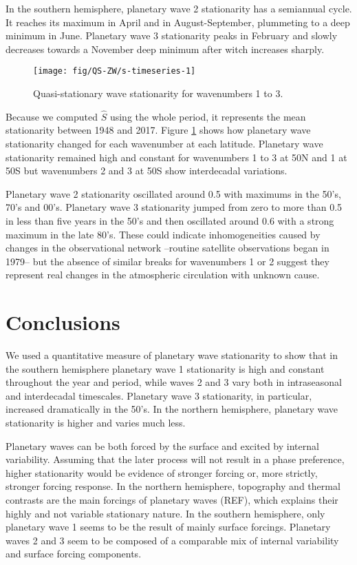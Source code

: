 \documentclass[draft,linenumbers]{agujournal2018}
\begin{document}
In the southern hemisphere, planetary wave 2 stationarity has a
semiannual cycle. It reaches its maximum in April and in
August-September, plummeting to a deep minimum in June. Planetary wave 3
stationarity peaks in February and slowly decreases towards a November
deep minimum after witch increases sharply.

\begin{figure}[h]

{\centering \texttt{[image: fig/QS-ZW/s-timeseries-1]} 

}

\caption{Quasi-stationary wave stationarity for wavenumbers 1 to 3.}\label{fig:s-timeseries}
\end{figure}

Because we computed \(\hat{S}\) using the whole period, it represents
the mean stationarity between 1948 and 2017. Figure
\ref{fig:s-timeseries} shows how planetary wave stationarity changed for
each wavenumber at each latitude. Planetary wave stationarity remained
high and constant for wavenumbers 1 to 3 at 50\degree N and 1 at
50\degree S but wavenumbers 2 and 3 at 50\degree S show interdecadal
variations.

Planetary wave 2 stationarity oscillated around 0.5 with maximums in the
50's, 70's and 00's. Planetary wave 3 stationarity jumped from zero to
more than 0.5 in less than five years in the 50's and then oscillated
around 0.6 with a strong maximum in the late 80's. These could indicate
inhomogeneities caused by changes in the observational network --routine
satellite observations began in 1979-- but the absence of similar breaks
for wavenumbers 1 or 2 suggest they represent real changes in the
atmospheric circulation with unknown cause.

\section{Conclusions}

We used a quantitative measure of planetary wave stationarity to show
that in the southern hemisphere planetary wave 1 stationarity is high
and constant throughout the year and period, while waves 2 and 3 vary
both in intraseasonal and interdecadal timescales. Planetary wave 3
stationarity, in particular, increased dramatically in the 50's. In the
northern hemisphere, planetary wave stationarity is higher and varies
much less.

Planetary waves can be both forced by the surface and excited by
internal variability. Assuming that the later process will not result in
a phase preference, higher stationarity would be evidence of stronger
forcing or, more strictly, stronger forcing response. In the northern
hemisphere, topography and thermal contrasts are the main forcings of
planetary waves (REF), which explains their highly and not variable
stationary nature. In the southern hemisphere, only planetary wave 1
seems to be the result of mainly surface forcings. Planetary waves 2 and
3 seem to be composed of a comparable mix of internal variability and
surface forcing components.
\end{document}
